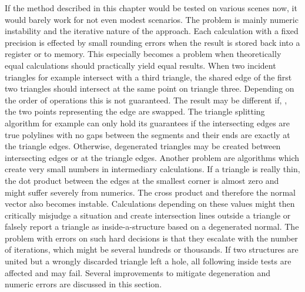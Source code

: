 If the method described in this chapter would be tested on various scenes now, it would barely work for not even modest scenarios.
The problem is mainly numeric instability and the iterative nature of the approach.
Each calculation with a fixed precision is effected by small rounding errors when the result is stored back into a register or to memory.
This especially becomes a problem when theoretically equal calculations should practically yield equal results.
When two incident triangles for example intersect with a third triangle, the shared edge of the first two triangles should intersect at the same point on triangle three.
Depending on the order of operations this is not guaranteed.
The result may be different if, \eg, the two points representing the edge are swapped.
%
The triangle splitting algorithm for example can only hold its guarantees if the intersecting edges are true polylines with no gaps between the segments and their ends are exactly at the triangle edges.
Otherwise, degenerated triangles may be created between intersecting edges or at the triangle edges.
%
Another problem are algorithms which create very small numbers in intermediary calculations.
If a triangle is really thin, the dot product between the edges at the smallest corner is almost zero and might suffer severely from numerics.
The cross product and therefore the normal vector also becomes instable.
Calculations depending on these values might then critically misjudge a situation and \eg create intersection lines outside a triangle or falsely report a triangle as inside-a-structure based on a degenerated normal.
The problem with errors on such hard decisions is that they escalate with the number of iterations, which might be several hundreds or thousands.
If two structures are united but a wrongly discarded triangle left a hole, all following inside tests are affected and may fail.
Several improvements to mitigate degeneration and numeric errors are discussed in this section.

